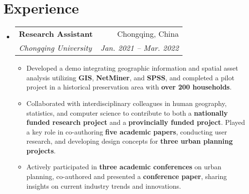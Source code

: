 \documentclass[letterpaper,11pt]{article}
\makeatletter
\newcommand{\resumeSubheading}[4]{
  \item
    \begin{tabular*}{0.98\textwidth}{l@{\extracolsep{\fill}}r}
      \textbf{#1} & {#2} \\
      \textit{\small{#3}} & \textit{\small{#4}}
    \end{tabular*}
}
\newcommand{\resumeSubHeadingListStart}{\begin{itemize}[leftmargin=0.15in, label={}]}
\newcommand{\resumeSubHeadingListEnd}{\end{itemize}}
\newcommand{\resumeItemListStart}{\begin{itemize}\small}
\newcommand{\resumeItemListEnd}{\end{itemize}}
\newcommand{\resumeItem}[1]{
  \item \small{#1}
}
\makeatother
\begin{document}
\section{Experience}
\resumeSubHeadingListStart
\resumeSubheading
{Research Assistant}{Chongqing, China}
{Chongqing University}{Jan. 2021 -- Mar. 2022}
\resumeItemListStart
\resumeItem{Developed a demo integrating geographic information and spatial asset analysis utilizing \textbf{GIS}, \textbf{NetMiner}, and \textbf{SPSS}, and completed a pilot project in a historical preservation area with \textbf{over 200 households}.}
\resumeItem{Collaborated with interdisciplinary colleagues in human geography, statistics, and computer science to contribute to both a \textbf{nationally funded research project} and a \textbf{provincially funded project}. Played a key role in co-authoring \textbf{five academic papers}, conducting user research, and developing design concepts for \textbf{three urban planning projects}.}
\resumeItem{Actively participated in \textbf{three academic conferences} on urban planning, co-authored and presented a \textbf{conference paper}, sharing insights on current industry trends and innovations.}
\resumeItemListEnd
\resumeSubHeadingListEnd
\end{document}
